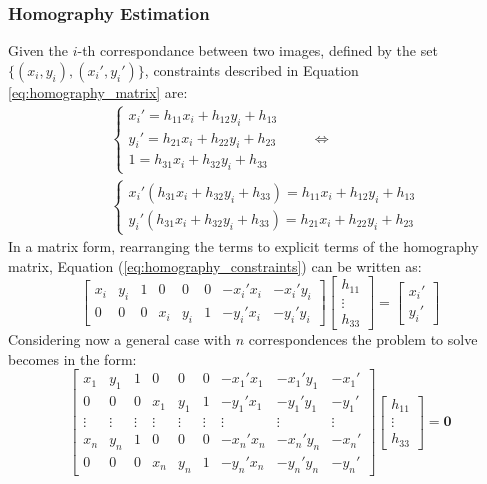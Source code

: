 \subsubsection*{Homography Estimation}
Given the $i$-th correspondance between two images, defined by the set 
$\{(x_i, y_i), (x_i', y_i')\}$, constraints described in Equation \ref{eq:homography_matrix}
are:
\begin{align}
&\begin{cases}
    x_i' = h_{11} x_i + h_{12} y_i + h_{13} \\
    y_i' = h_{21} x_i + h_{22} y_i + h_{23} \\
    1 = h_{31} x_i + h_{32} y_i + h_{33}
\end{cases}
\qquad \Longleftrightarrow \nonumber\\[0.2cm]
&\begin{cases}
    x_i' \left(h_{31} x_i + h_{32} y_i + h_{33}\right) = h_{11} x_i + h_{12} y_i + h_{13} \\
    y_i' \left(h_{31} x_i + h_{32} y_i + h_{33}\right) = h_{21} x_i + h_{22} y_i + h_{23}
    \label{eq:homography_constraints}
\end{cases}
\end{align}
In a matrix form, rearranging the terms to explicit terms of the homography matrix,
Equation (\ref{eq:homography_constraints}) can be written as:
\begin{equation}
    \begin{bmatrix}
        x_i & y_i & 1 & 0 & 0 & 0 & -x_i'x_i & -x_i'y_i \\
        0 & 0 & 0 & x_i & y_i & 1 & -y_i'x_i & -y_i'y_i
    \end{bmatrix}
    \begin{bmatrix}
        h_{11} \\
        \vdots \\
        h_{33}
    \end{bmatrix}
    =
    \begin{bmatrix}
        x_i' \\
        y_i'
    \end{bmatrix}
    \label{eq:homography_matrix_constraints}
\end{equation}
Considering now a general case with $n$ correspondences the problem to solve 
becomes in the form:
\begin{equation}
\begin{bmatrix}
    x_1 & y_1 & 1 & 0 & 0 & 0 & -x_1'x_1 & -x_1'y_1 & -x_1'\\
    0 & 0 & 0 & x_1 & y_1 & 1 & -y_1'x_1 & -y_1'y_1 & -y_1'\\
    \vdots & \vdots & \vdots & \vdots & \vdots & \vdots & \vdots & \vdots & \vdots \\
    x_n & y_n & 1 & 0 & 0 & 0 & -x_n'x_n & -x_n'y_n & -x_n'\\
    0 & 0 & 0 & x_n & y_n & 1 & -y_n'x_n & -y_n'y_n & -y_n'
\end{bmatrix}
\begin{bmatrix}
    h_{11} \\
    \vdots \\
    h_{33}
\end{bmatrix}
=
\boldsymbol{0}
\label{eq:homography_matrix_constraints_general}
\end{equation}
